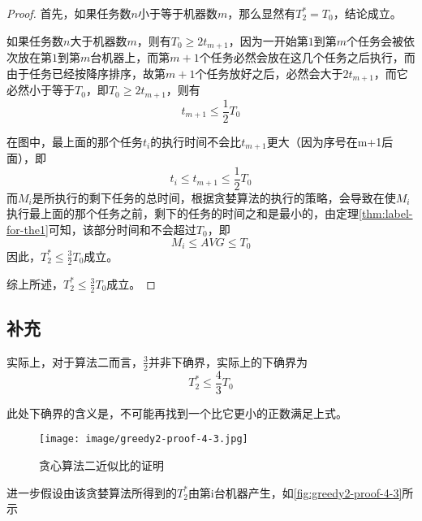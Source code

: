 \begin{proof}
	首先，如果任务数$n$小于等于机器数$m$，那么显然有$T_2^*=T_0$，结论成立。

	如果任务数$n$大于机器数$m$，则有$T_0 \geq 2t_{m+1}$，因为一开始第$1$到第$m$个任务会被依次放在第$1$到第$m$台机器上，而第$m+1$个任务必然会放在这几个任务之后执行，而由于任务已经按降序排序，故第$m+1$个任务放好之后，必然会大于$2t_{m+1}$，而它必然小于等于$T_0$，即$T_0 \geq 2t_{m+1}$，则有
	\begin{equation*}
		t_{m+1} \leq \frac{1}{2}T_0
	\end{equation*}
	
	在图中，最上面的那个任务$t_i$的执行时间不会比$t_{m+1}$更大（因为序号在m+1后面），即
	\begin{equation*}
		t_i \leq t_{m+1} \leq \frac{1}{2}T_0
	\end{equation*}
	而$M_i$是所执行的剩下任务的总时间，根据贪婪算法的执行的策略，会导致在使$M_i$执行最上面的那个任务之前，剩下的任务的时间之和是最小的，由定理\ref{thm:label-for-the1}可知，该部分时间和不会超过$T_0$，即
	\begin{equation*}
		M_i \leq AVG \leq T_0
	\end{equation*}
	因此，$T_2^*\leq \frac{3}{2}T_0$成立。

	综上所述，$T_2^*\leq \frac{3}{2}T_0$成立。
\end{proof}

\subsection{补充}
实际上，对于算法二而言，$\frac{3}{2}$并非下确界，实际上的下确界为
\begin{equation*}
	T_2^*\leq \frac{4}{3} T_0
\end{equation*}

此处下确界的含义是，不可能再找到一个比它更小的正数满足上式。

\begin{figure}[hbt]
	\centering
	\texttt{[image: image/greedy2-proof-4-3.jpg]}
	\caption{贪心算法二近似比的证明}\label{fig:greedy2-proof-4-3}
\end{figure}
进一步假设由该贪婪算法所得到的$T_2^*$由第i台机器产生，如\autoref{fig:greedy2-proof-4-3}所示

